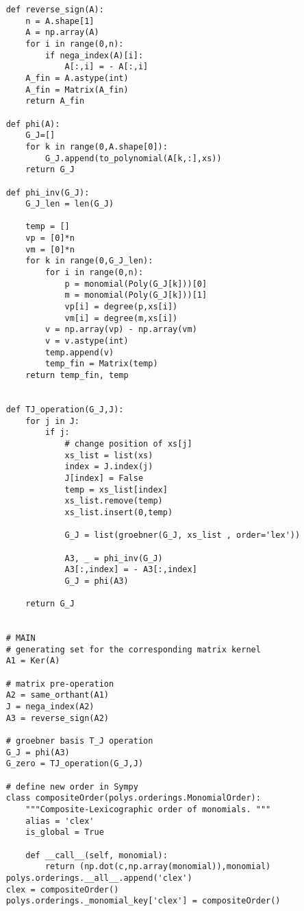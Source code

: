 \documentclass{article}
\theoremstyle{plain}
\theoremstyle{definition}
\begin{document}
\begin{propsition}
\begin{verbatim}
    def reverse_sign(A):
        n = A.shape[1]
        A = np.array(A)
        for i in range(0,n):
            if nega_index(A)[i]:
                A[:,i] = - A[:,i]
        A_fin = A.astype(int)
        A_fin = Matrix(A_fin)
        return A_fin

    def phi(A):
        G_J=[]
        for k in range(0,A.shape[0]):
            G_J.append(to_polynomial(A[k,:],xs))
        return G_J

    def phi_inv(G_J):
        G_J_len = len(G_J)

        temp = []
        vp = [0]*n
        vm = [0]*n
        for k in range(0,G_J_len):
            for i in range(0,n):
                p = monomial(Poly(G_J[k]))[0]
                m = monomial(Poly(G_J[k]))[1]
                vp[i] = degree(p,xs[i])
                vm[i] = degree(m,xs[i])
            v = np.array(vp) - np.array(vm)
            v = v.astype(int)
            temp.append(v)
            temp_fin = Matrix(temp)
        return temp_fin, temp
    
    
    def TJ_operation(G_J,J):
        for j in J:
            if j:
                # change position of xs[j]
                xs_list = list(xs)
                index = J.index(j)
                J[index] = False
                temp = xs_list[index]
                xs_list.remove(temp)
                xs_list.insert(0,temp)

                G_J = list(groebner(G_J, xs_list , order='lex'))

                A3, _ = phi_inv(G_J)
                A3[:,index] = - A3[:,index]
                G_J = phi(A3)

        return G_J
    
   
    # MAIN
    # generating set for the corresponding matrix kernel
    A1 = Ker(A)
    
    # matrix pre-operation
    A2 = same_orthant(A1)
    J = nega_index(A2)
    A3 = reverse_sign(A2)
    
    # groebner basis T_J operation
    G_J = phi(A3)
    G_zero = TJ_operation(G_J,J)
    
    # define new order in Sympy
    class compositeOrder(polys.orderings.MonomialOrder):
        """Composite-Lexicographic order of monomials. """
        alias = 'clex'
        is_global = True

        def __call__(self, monomial):
            return (np.dot(c,np.array(monomial)),monomial)
    polys.orderings.__all__.append('clex')
    clex = compositeOrder()
    polys.orderings._monomial_key['clex'] = compositeOrder() 
    

\end{verbatim}
\end{propsition}
\end{document}
